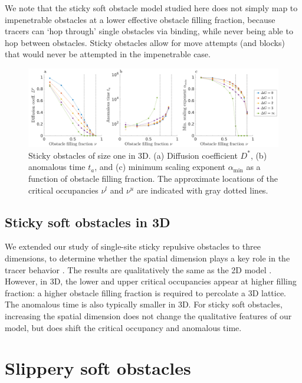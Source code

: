 We note that the sticky soft obstacle model studied here does not simply map to
impenetrable obstacles at a lower effective obstacle filling fraction, because
tracers can `hop through' single obstacles via binding, while never being able
to hop between obstacles.  Sticky obstacles allow for move attempts (and blocks)
that would never be attempted in the impenetrable case.
\begin{figure}[!hb]
  \begin{center}
	  \includegraphics[width=150mm]{figs/ch02_soft/soft_sticky_3d.png}
  \end{center}
	\caption[Sticky diffusion in 3D]
    {Sticky obstacles of size one in 3D. (a) Diffusion
    coefficient $D^*$, (b) anomalous time $ t_a $, and (c) minimum
    scaling exponent $\alpha_{\min}$ as a function of obstacle
    filling fraction. The approximate locations of the critical
    occupancies $ \nu^l $ and $ \nu^u $ are indicated with gray dotted
    lines.}\label{fig:sticky_3d}
\end{figure}

\subsection{Sticky soft obstacles in 3D}

We extended our study of single-site sticky repulsive obstacles to three
dimensions, to determine whether the spatial dimension plays a key role in the
tracer behavior . The results are qualitatively the same
as the 2D model .  However, in 3D, the lower and upper
critical occupancies appear at higher filling fraction: a higher obstacle
filling fraction is required to percolate a 3D lattice. The anomalous time is
also typically smaller in 3D. For sticky soft obstacles, increasing the spatial
dimension does not change the qualitative features of our model, but does shift
the critical occupancy and anomalous time.

\section{Slippery soft obstacles}

